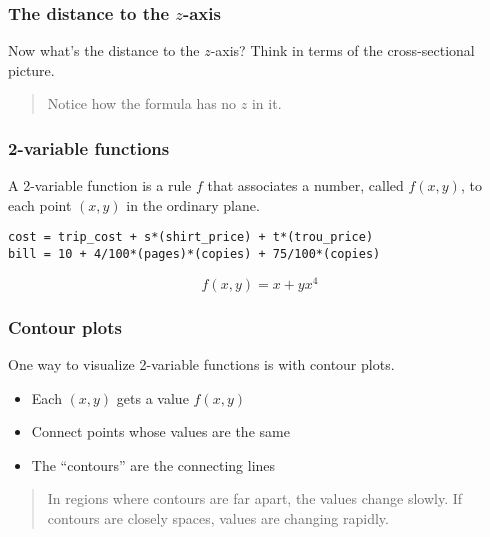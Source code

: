 \documentclass[11pt,ignorenonframetext,aspectratio=169]{beamer}
\begin{document}
\begin{frame}\frametitle{The distance to the $z$-axis}

Now what's the distance to the $z$-axis? Think in terms of the
cross-sectional picture.

\begin{quote}
Notice how the formula has no $z$ in it.
\end{quote}

\end{frame}

\begin{frame}[fragile]\frametitle{2-variable functions}

A 2-variable function is a rule $f$ that associates a number, called
$f(x,y)$, to each point $(x,y)$ in the ordinary plane.

\begin{verbatim}
cost = trip_cost + s*(shirt_price) + t*(trou_price)
bill = 10 + 4/100*(pages)*(copies) + 75/100*(copies)
\end{verbatim}

\[ f(x,y) = x + yx^4 \]

\end{frame}

\begin{frame}\frametitle{Contour plots}

One way to visualize 2-variable functions is with contour plots.

\begin{itemize}[<+->]

\item
  Each $(x,y)$ gets a value $f(x,y)$
\item
  Connect points whose values are the same
\item
  The ``contours'' are the connecting lines
\end{itemize}

\begin{quote}
In regions where contours are far apart, the values change slowly. If
contours are closely spaces, values are changing rapidly.
\end{quote}

\end{frame}
\end{document}
